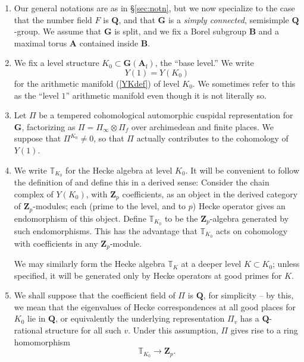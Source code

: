 \documentclass[10pt]{amsart}
\newcommand{\Z}{\mathbf{Z}}
\newcommand{\Afinite}{\mathbf{A}_{\mathrm{f}}}
\newcommand{\Q}{\mathbf{Q}}
\theoremstyle{remark}
\begin{document}
 
 \begin{enumerate}
 
 \item Our general notations are  as in \S \ref{sec:notn}, but we now specialize
 to the case that the number field $F$ is $\Q$, and that 
  $\mathbf{G}$ is  a {\em simply connected},  semisimple $\Q$-group.  We assume that $\mathbf{G}$ is split,  and we fix a Borel subgroup $\mathbf{B}$ and a maximal torus $\mathbf{A}$ contained inside $\mathbf{B}$. 
 
 

\item 
We fix a level structure $K_0 \subset   \mathbf{G}(\Afinite)$, the ``base level.''    
   We write $$Y(1)=Y(K_0)$$ for the arithmetic manifold (\eqref{YKdef}) of level $K_0$.
   We sometimes refer to this as the ``level $1$'' arithmetic manifold even though it is not literally so. 

   \item Let $\Pi$ be a tempered  cohomological automorphic cuspidal representation for $\mathbf{G}$, factorizing
as $\Pi = \Pi_{\infty} \otimes \Pi_f$ over archimedean and finite places.  \index{$\Pi$}   
We suppose that $\Pi^{K_0} \neq 0$, so that $\Pi$ actually contributes to the cohomology of $Y(1)$. 
      
   \item We write $\mathbb{T}_{K_0}$ for the Hecke algebra at level $K_0$. It will be convenient to follow the definition of
   \cite{KT} and define this in a derived sense:
   Consider the chain complex of $Y(K_0)$, with $\Z_p$ coefficients,  as an object in the derived category of $\Z_p$-modules; each
  (prime to the level, and to $p$) Hecke operator gives an endomorphism of this object. Define 
   $\mathbb{T}_{K_0}$ to be the  $\Z_p$-algebra generated by such endomorphisms.  
This has the advantage that $\mathbb{T}_{K_0}$ acts on cohomology with coefficients
in any $\Z_p$-module. 

We may similarly form the Hecke algebra $\mathbb{T}_K$ at a deeper level $K \subset K_0$; 
unless specified, it will be generated only by Hecke operators at good primes for $K$. 
   
  \item  We shall suppose that the coefficient field of $\Pi$ is $\Q$, for simplicity -- by this, we mean that  the eigenvalues of Hecke correspondences at 
 all good places for $K_0$ lie in $\Q$,
  or equivalently the underlying representation $\Pi_v$ has a $\Q$-rational structure for  all such $v$. %
Under this assumption,  $\Pi$ gives
   rise to a ring homomorphism 
\begin{equation} \label{oort}  \mathbb{T}_{K_0} \rightarrow \Z_p.\end{equation}
   

\end{enumerate}
\end{document}
